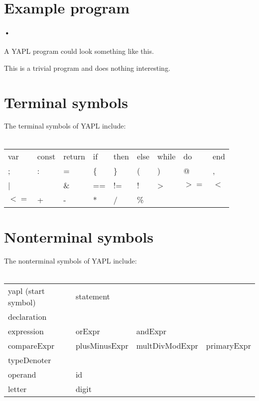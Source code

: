 \setlength{\grammarparsep}{10pt plus 1pt minus 1pt} %
\setlength{\grammarindent}{12em} %
\section{Example program}

\paragraph{•}
A YAPL program could look something like this.


This is a trivial program and does nothing interesting. 
\section{Terminal symbols}
The terminal symbols of YAPL include:\\\\
\begin{tabular}{lllllllll}
var		&	const	&	return	&	if	&	then	&	else	&	while	&	do		&	end 	\\
;		&	: 		& 	= 		& 	\{ 	& 	\} 		& 	( 		& 	) 		& 	@ 		& 	, 		\\ 
| 		& 	\		&	\& 		& 	== 	& 	!= 		& 	! 		& 	> 		& 	$>=$	& 	$<$ 	\\
$<=$	&	+ 		& 	- 		& 	* 	& 	/ 		& 	\% 	\\
\end{tabular}

\section{Nonterminal symbols}
The nonterminal symbols of YAPL include:\\\\
\begin{tabular}{llll}
yapl	 (start symbol)		&	statement		&					&				\\
declaration					&					&					&				\\
expression					&	orExpr			&	andExpr			&				\\
compareExpr					&	plusMinusExpr	&	multDivModExpr	&	primaryExpr	\\
typeDenoter					&					&					&				\\
operand						&	id				&					&				\\
letter						&	digit			&					&				\\
\end{tabular}

